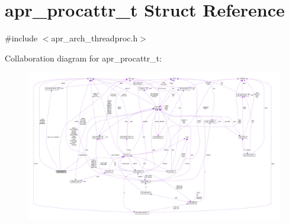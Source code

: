 \hypertarget{structapr__procattr__t}{}\section{apr\+\_\+procattr\+\_\+t Struct Reference}
\label{structapr__procattr__t}


{\ttfamily \#include $<$apr\+\_\+arch\+\_\+threadproc.\+h$>$}



Collaboration diagram for apr\+\_\+procattr\+\_\+t\+:
\nopagebreak
\begin{figure}[H]
\begin{center}
\leavevmode
\includegraphics[width=350pt]{structapr__procattr__t__coll__graph}
\end{center}
\end{figure}

